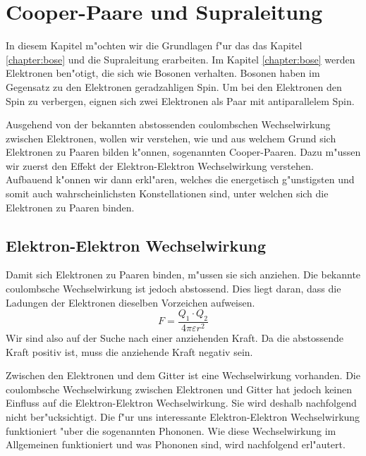 \chapter{Cooper-Paare und Supraleitung\label{chapter:supraleitung}}
\begin{refsection}

In diesem Kapitel m"ochten wir die Grundlagen f"ur das das Kapitel \ref{chapter:bose} und
die Supraleitung erarbeiten. Im Kapitel \ref{chapter:bose} werden Elektronen ben"otigt,
die sich wie Bosonen verhalten. Bosonen haben im Gegensatz zu den Elektronen
geradzahligen Spin. Um bei den Elektronen den Spin zu verbergen, eignen sich zwei Elektronen als Paar mit
antiparallelem Spin.

Ausgehend von der bekannten abstossenden coulombschen Wechselwirkung zwischen Elektronen,
wollen wir verstehen, wie und aus welchem Grund sich Elektronen zu Paaren bilden k"onnen,
sogenannten Cooper-Paaren.
Dazu m"ussen wir zuerst den Effekt der Elektron-Elektron Wechselwirkung verstehen.
Aufbauend k"onnen wir dann erkl"aren, welches die energetisch g"unstigsten und somit auch
wahrscheinlichsten Konstellationen sind, unter welchen sich die Elektronen zu Paaren binden.

\section{Elektron-Elektron Wechselwirkung\label{supraleitung:elektronelektronwechselwirkung}}
Damit sich Elektronen zu Paaren binden, m"ussen sie sich anziehen.
Die bekannte coulombsche Wechselwirkung ist jedoch abstossend.
Dies liegt daran, dass die Ladungen der Elektronen dieselben Vorzeichen aufweisen.
\begin{equation}
F = \frac{Q_1\cdot Q_2}{4\pi \varepsilon r^2}
\label{supraleitung:Coulomb}
\end{equation}
Wir sind also auf der Suche nach einer anziehenden Kraft.
Da die abstossende Kraft positiv ist, muss die anziehende Kraft negativ sein.

Zwischen den Elektronen und dem Gitter ist eine Wechselwirkung vorhanden.
Die coulombsche Wechselwirkung zwischen Elektronen und Gitter hat jedoch keinen Einfluss auf die
Elektron-Elektron Wechselwirkung.
Sie wird deshalb nachfolgend nicht ber"ucksichtigt.
Die f"ur uns interessante Elektron-Elektron Wechselwirkung funktioniert "uber die sogenannten Phononen.
Wie diese Wechselwirkung im Allgemeinen funktioniert und was Phononen sind, wird nachfolgend erl"autert.


\end{refsection}
